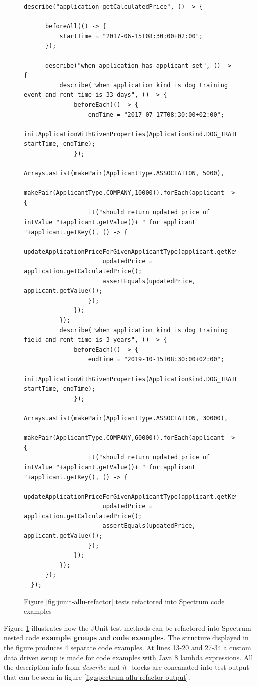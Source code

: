     \begin{figure}[H]
        \begin{lstlisting}[style=java]
  describe("application getCalculatedPrice", () -> {

      beforeAll(() -> {
          startTime = "2017-06-15T08:30:00+02:00";
      });

      describe("when application has applicant set", () -> {
          describe("when application kind is dog training event and rent time is 33 days", () -> {
              beforeEach(() -> {
                  endTime = "2017-07-17T08:30:00+02:00";
                  initApplicationWithGivenProperties(ApplicationKind.DOG_TRAINING_EVENT, startTime, endTime);
              });
              Arrays.asList(makePair(ApplicantType.ASSOCIATION, 5000),
                      makePair(ApplicantType.COMPANY,10000)).forEach(applicant -> {
                  it("should return updated price of intValue "+applicant.getValue()+ " for applicant "+applicant.getKey(), () -> {
                      updateApplicationPriceForGivenApplicantType(applicant.getKey());
                      updatedPrice = application.getCalculatedPrice();
                      assertEquals(updatedPrice, applicant.getValue());
                  });
              });
          });
          describe("when application kind is dog training field and rent time is 3 years", () -> {
              beforeEach(() -> {
                  endTime = "2019-10-15T08:30:00+02:00";
                  initApplicationWithGivenProperties(ApplicationKind.DOG_TRAINING_FIELD, startTime, endTime);
              });
              Arrays.asList(makePair(ApplicantType.ASSOCIATION, 30000),
                            makePair(ApplicantType.COMPANY,60000)).forEach(applicant -> {
                  it("should return updated price of intValue "+applicant.getValue()+ " for applicant "+applicant.getKey(), () -> {
                      updateApplicationPriceForGivenApplicantType(applicant.getKey());
                      updatedPrice = application.getCalculatedPrice();
                      assertEquals(updatedPrice, applicant.getValue());
                  });
              });
          });
      });
  });
        \end{lstlisting}
        \caption{Figure \ref{fig:junit-allu-refactor} tests refactored into Spectrum code examples}
        \label{fig:spectrum-allu-refactor}
    \end{figure}
    \restoregeometry

    Figure \ref{fig:spectrum-allu-refactor} illustrates how the JUnit test methods can be refactored into Spectrum
    nested code \textbf{example groups} and \textbf{code examples}. The structure displayed in the figure produces 4 separate
    code examples. At lines 13-20 and 27-34 a custom data driven setup is made for code examples with Java 8 lambda expressions.
    All the description info from \textit{describe} and \textit{it} -blocks are concanated into test output
    that can be seen in figure \ref{fig:spectrum-allu-refactor-output}.

